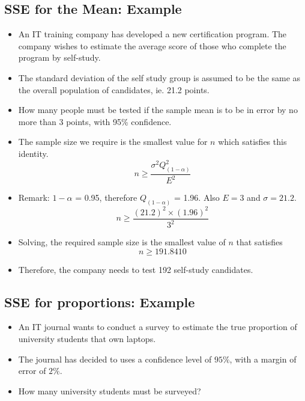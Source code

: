 \documentclass[]{report}
\begin{document}


\subsection{SSE for the Mean: Example}

\begin{itemize}
\item An IT training company has developed a new certification program. The company wishes to estimate the average score of those who complete the program by self-study.  \item The standard deviation of the self study group is assumed to be the same as the overall population of candidates, ie. 21.2 points.
\item How many people must be tested if the sample mean is to be in error by no more than 3 points, with 95\% confidence.
\end{itemize}



\begin{itemize}
\item The sample size we require is the smallest value for $n$ which satisfies this identity.
\[ n \geq \frac{\sigma^2 Q^2_{(1-\alpha)}}{E^2}  \]
\item Remark: $1-\alpha$ = 0.95, therefore $Q_{(1-\alpha)}$ = 1.96. Also $E=3$ and $\sigma =21.2$.
\[ n \geq \frac{(21.2)^2 \times (1.96)^2}{3^2} \]
\item Solving, the required sample size is the smallest value of $n$ that satisfies
\[ n \geq 191.8410 \]
\item Therefore, the company needs to test 192 self-study candidates.
\end{itemize}



\subsection{SSE for proportions: Example}
\begin{itemize}
\item An IT journal wants to conduct a survey to estimate the true proportion of university students that own laptops.
\item The journal has decided to uses a confidence level of $95\%$, with a margin of error of $2\%$.
\item How many university students must be surveyed?
\end{itemize}
\end{document}
